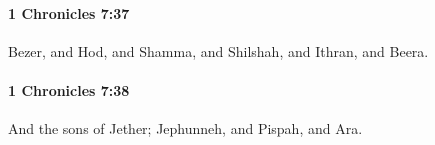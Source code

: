		\paragraph{1 Chronicles 7:37} %
			\label{1CHRONICLES-7-37}

			Bezer, and Hod, and Shamma, and Shilshah, and Ithran, and Beera.


		\paragraph{1 Chronicles 7:38} %
			\label{1CHRONICLES-7-38}

			And the sons of Jether; Jephunneh, and Pispah, and Ara.


